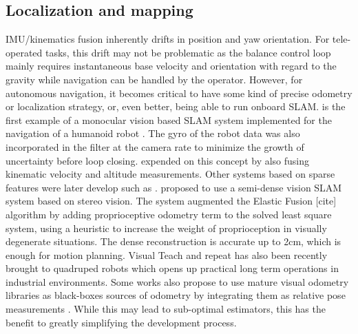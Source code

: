 \subsection{Localization and mapping}
IMU/kinematics fusion inherently drifts in position and yaw orientation. For tele-operated tasks, this drift may not be problematic as the balance control loop
mainly requires instantaneous base velocity and orientation with regard to the gravity while navigation can be handled by the operator. However, for autonomous
navigation, it becomes critical to have some kind of precise odometry or localization strategy, or, even better, being able to run onboard SLAM. 
\cite{davison2007monoslam} is the first example of a monocular vision based SLAM system implemented for the navigation of a humanoid robot . The gyro of the robot data
was also incorporated in the filter at the camera rate to minimize the growth of uncertainty before loop closing. \cite{stasse2006real} expended on this concept by also fusing
kinematic velocity and altitude measurements. Other systems based on sparse features were later develop such as \cite{ahn2012board, oriolo2012vision, oriolo2016humanoid, kwak20093d}.
\cite{scona2017direct} proposed to use a semi-dense vision SLAM system based on stereo vision. The system augmented the Elastic Fusion [cite] algorithm by adding 
proprioceptive odometry term to the solved least square system, using a heuristic to increase the weight of proprioception in visually degenerate situations. The 
dense reconstruction is accurate up to 2cm, which is enough for motion planning. Visual Teach and repeat \cite{furgale2010visual} has also been recently brought to quadruped 
robots \cite{mattamala2021learning} which opens up practical long term operations in industrial environments. Some works also propose to use mature visual odometry libraries
as black-boxes sources of odometry by integrating them as relative pose measurements \cite{hartley2018legged,hartley2018hybrid}. While this may lead to sub-optimal estimators, 
this has the benefit to greatly simplifying the development process.

